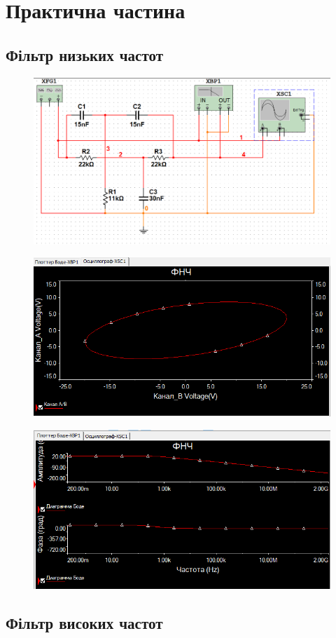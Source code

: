 \section{Практична частина}
\subsection{Фільтр низьких частот}
\setlength{\parindent}{4em}


\begin{figure}[ht]
\centering
\includegraphics[width=0.6\linewidth]{Pic/first_circuit.png}
\end{figure}


\begin{figure}[ht]
\centering
\includegraphics[width=0.65\linewidth]{Pic/first_1.png}
\end{figure}


\begin{figure}[ht]
\centering
\includegraphics[width=0.65\linewidth]{Pic/first_2.png}
\end{figure}
\newpage

\subsection{Фільтр високих частот}
\setlength{\parindent}{4em}


